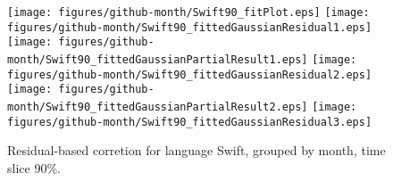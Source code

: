 \begin{figure}[hb]
\centering
{}
{\texttt{[image: figures/github-month/Swift90\_fitPlot.eps]}}
{\texttt{[image: figures/github-month/Swift90\_fittedGaussianResidual1.eps]}}
{\texttt{[image: figures/github-month/Swift90\_fittedGaussianPartialResult1.eps]}}
{\texttt{[image: figures/github-month/Swift90\_fittedGaussianResidual2.eps]}}
{\texttt{[image: figures/github-month/Swift90\_fittedGaussianPartialResult2.eps]}}
{\texttt{[image: figures/github-month/Swift90\_fittedGaussianResidual3.eps]}}
\caption{Residual-based corretion for language Swift, grouped by month, time slice 90\%.}
\end{figure}


\clearpage 
\newpage 


